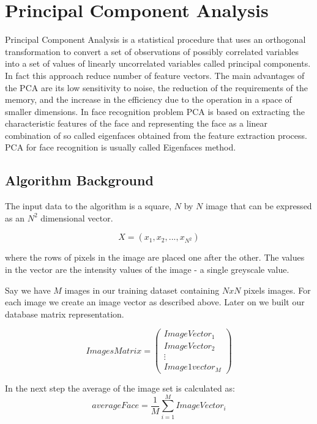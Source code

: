 
\chapter{Principal Component Analysis}
\label{cha:PCA}

Principal Component Analysis is a statistical procedure that uses an orthogonal transformation to convert a set of observations of possibly correlated variables into a set of values of linearly uncorrelated variables called principal components. In fact this approach reduce number of feature vectors. The main advantages of the PCA are its low sensitivity to noise, the reduction of the requirements of the memory, and the increase in the efficiency due to the operation in a space of smaller dimensions. In face recognition problem PCA is based on extracting the characteristic features of the face and representing the face as a linear combination of so called eigenfaces obtained from the feature extraction process. PCA for face recognition is usually called Eigenfaces method.


\section{Algorithm Background}
The input data to the algorithm is a square, $N$ by  $N$ image that can be expressed as an $N^{2}$ dimensional vector. 

\begin{equation}
X = ( x_{1}, x_{2}, ... , x_{N^{2}})
\end{equation}

where the rows of pixels in the image are placed one after the other. The values in the vector are the intensity values of the image - a single greyscale value. 

Say we have $M$ images in our training dataset containing $NxN$ pixels images. For each image we create an image vector as described above. Later on we built our database matrix representation.


\begin{equation}
ImagesMatrix = 
 \begin{pmatrix}
 ImageVector_{1} \\
 ImageVector_{2} \\
  \vdots  \\
 Image1vector_{M} 
 \end{pmatrix}
 \end{equation}
 
In the next step the average of the image set is calculated as:
\begin{equation}
averageFace = \frac{1}{M} \sum_{i=1}^{M} ImageVector_{i}
\end{equation}

